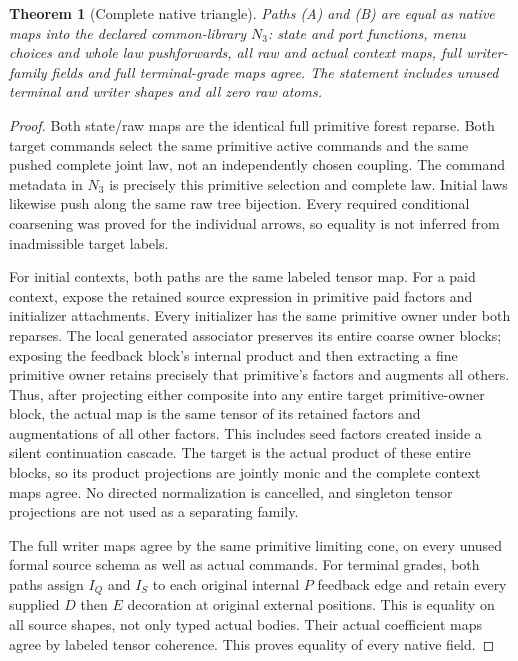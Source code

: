 \documentclass[11pt]{article}\usepackage{amsmath,amssymb,amsthm,geometry}\geometry{margin=1in}\newtheorem{theorem}{Theorem}
\begin{document}
\begin{theorem}[Complete native triangle]
Paths (A) and (B) are equal as native maps into the declared common-library $N_3$: state and port functions, menu choices and whole law pushforwards, all raw and actual context maps, full writer-family fields and full terminal-grade maps agree. The statement includes unused terminal and writer shapes and all zero raw atoms.
\end{theorem}
\begin{proof}
Both state/raw maps are the identical full primitive forest reparse. Both target commands select the same primitive active commands and the same pushed complete joint law, not an independently chosen coupling. The command metadata in $N_3$ is precisely this primitive selection and complete law. Initial laws likewise push along the same raw tree bijection. Every required conditional coarsening was proved for the individual arrows, so equality is not inferred from inadmissible target labels.

For initial contexts, both paths are the same labeled tensor map. For a paid context, expose the retained source expression in primitive paid factors and initializer attachments. Every initializer has the same primitive owner under both reparses. The local generated associator preserves its entire coarse owner blocks; exposing the feedback block's internal product and then extracting a fine primitive owner retains precisely that primitive's factors and augments all others. Thus, after projecting either composite into any entire target primitive-owner block, the actual map is the same tensor of its retained factors and augmentations of all other factors. This includes seed factors created inside a silent continuation cascade. The target is the actual product of these entire blocks, so its product projections are jointly monic and the complete context maps agree. No directed normalization is cancelled, and singleton tensor projections are not used as a separating family.

The full writer maps agree by the same primitive limiting cone, on every unused formal source schema as well as actual commands. For terminal grades, both paths assign $I_Q$ and $I_S$ to each original internal $P$ feedback edge and retain every supplied $D$ then $E$ decoration at original external positions. This is equality on all source shapes, not only typed actual bodies. Their actual coefficient maps agree by labeled tensor coherence. This proves equality of every native field.
\end{proof}
\end{document}
